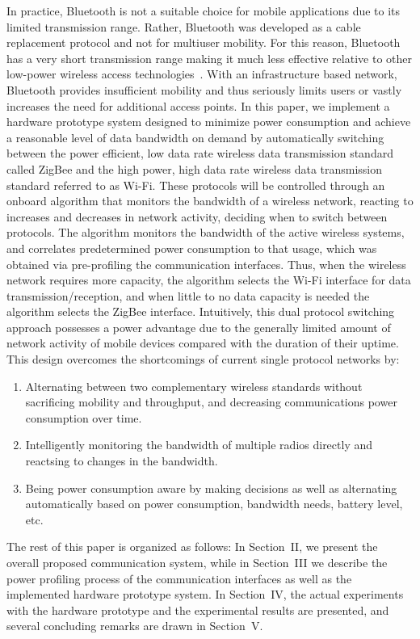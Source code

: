 \documentclass[conference]{IEEEtran}
\begin{document}
In practice, Bluetooth is not a suitable choice for mobile
applications due to its limited transmission range. Rather,
Bluetooth was developed as a cable replacement protocol and not for
multiuser mobility.  For this reason, Bluetooth has a very short
transmission range making it much less effective relative to other
low-power wireless access technologies~\cite{thirteen}. With an
infrastructure based network, Bluetooth provides insufficient
mobility and thus seriously limits users or vastly increases the
need for additional access points. In this paper, we implement a
hardware prototype system designed to minimize power consumption and
achieve a reasonable level of data bandwidth on demand by
automatically switching between the power efficient, low data rate
wireless data transmission standard called ZigBee and the high
power, high data rate wireless data transmission standard referred
to as Wi-Fi.  These protocols will be controlled through an onboard
algorithm that monitors the bandwidth of a wireless network,
reacting to increases and decreases in network activity, deciding
when to switch between protocols. The algorithm monitors the
bandwidth of the active wireless systems, and correlates
predetermined power consumption to that usage, which was obtained
via pre-profiling the communication interfaces.  Thus, when the
wireless network requires more capacity, the algorithm selects the
Wi-Fi interface for data transmission/reception, and when little to
no data capacity is needed the algorithm selects the ZigBee
interface.  Intuitively, this dual protocol switching approach
possesses a power advantage due to the generally limited amount of
network activity of mobile devices compared with the duration of
their uptime. This design overcomes the shortcomings of current
single protocol networks by:
\begin{enumerate}
  \item  Alternating between two complementary wireless standards without sacrificing mobility and throughput, and decreasing communications power consumption over time.
  \item  Intelligently monitoring the bandwidth of multiple radios directly and reactsing to changes in the bandwidth.
  \item  Being power consumption aware by making decisions as well as alternating automatically based on power consumption, bandwidth needs, battery level,
  etc.
\end{enumerate}

The rest of this paper is organized as follows: In Section~II, we
present the overall proposed communication system, while in
Section~III we describe the power profiling process of the
communication interfaces as well as the implemented hardware
prototype system.  In Section~IV, the actual experiments with the
hardware prototype and the experimental results are presented, and
several concluding remarks are drawn in Section~V.
\end{document}
